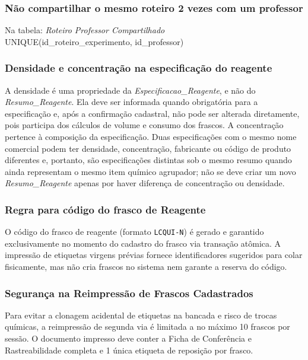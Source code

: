 \subsubsection{Não compartilhar o mesmo roteiro 2 vezes com um professor}
\begin{regra}
Na tabela: \textit{Roteiro Professor Compartilhado} \\
UNIQUE(id\_roteiro\_experimento, id\_professor)
\end{regra}
\subsubsection{Densidade e concentração na especificação do reagente}
\begin{regra}
A densidade é uma propriedade da \textit{Especificacao\_Reagente}, e não do \textit{Resumo\_Reagente}. Ela deve ser informada quando obrigatória para a especificação e, após a confirmação cadastral, não pode ser alterada diretamente, pois participa dos cálculos de volume e consumo dos frascos. A concentração pertence à composição da especificação. Duas especificações com o mesmo nome comercial podem ter densidade, concentração, fabricante ou código de produto diferentes e, portanto, são especificações distintas sob o mesmo resumo quando ainda representam o mesmo item químico agrupador; não se deve criar um novo \textit{Resumo\_Reagente} apenas por haver diferença de concentração ou densidade.
\end{regra}
\subsubsection{Regra para código do frasco de Reagente}
\begin{regra}
O código do frasco de reagente (formato \texttt{LCQUI-N}) é gerado e garantido exclusivamente no momento do cadastro do frasco via transação atômica. A impressão de etiquetas virgens prévias fornece identificadores sugeridos para colar fisicamente, mas não cria frascos no sistema nem garante a reserva do código.
\end{regra}

\subsubsection{Segurança na Reimpressão de Frascos Cadastrados}
\begin{regra}
Para evitar a clonagem acidental de etiquetas na bancada e risco de trocas químicas, a reimpressão de segunda via é limitada a no máximo 10 frascos por sessão. O documento impresso deve conter a Ficha de Conferência e Rastreabilidade completa e 1 única etiqueta de reposição por frasco.
\end{regra}
